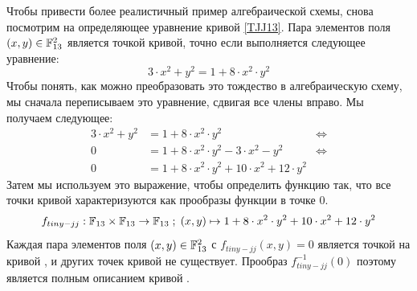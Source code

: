 \begin{example}
\label{ex:TJJ-circuit_1} Чтобы привести более реалистичный пример алгебраической схемы, снова посмотрим на определяющее уравнение кривой  \ref{TJJ13}. Пара элементов поля 
$(x,y)\in \mathbb{F}_{13}^2$ является точкой кривой, точно если выполняется следующее уравнение:
$$
3\cdot x^2 + y^2 = 1+ 8\cdot x^2\cdot y^2
$$ 
Чтобы понять, как можно преобразовать это тождество в алгебраическую схему, мы сначала переписываем это уравнение, сдвигая все члены вправо. Мы получаем следующее:
\begin{align*}
3\cdot x^2 + y^2 & = 1+ 8\cdot x^2\cdot y^2 & \Leftrightarrow\\
0 & = 1+ 8\cdot x^2\cdot y^2 - 3\cdot x^2 - y^2 & \Leftrightarrow\\
0 & = 1+ 8\cdot x^2\cdot y^2 + 10\cdot x^2 +12\cdot y^2
\end{align*}
Затем мы используем это выражение, чтобы определить функцию так, что все точки кривой  характеризуются как прообразы функции в точке $0$.
$$
f_{tiny-jj}: \mathbb{F}_{13}\times \mathbb{F}_{13}\to \mathbb{F}_{13}\; ; \;
(x,y)\mapsto 1+ 8\cdot x^2\cdot y^2 + 10\cdot x^2 +12\cdot y^2
$$
Каждая пара элементов поля $(x,y)\in \mathbb{F}_{13}^2$ с $f_{tiny-jj}(x,y)=0$ является точкой на кривой , и других точек кривой не существует. Прообраз $f_{tiny-jj}^{-1}(0)$ поэтому является полным описанием кривой .


\end{example}
